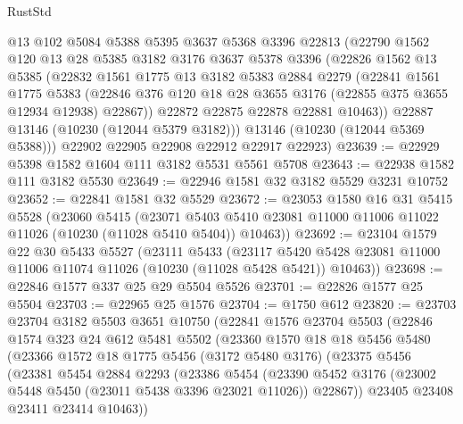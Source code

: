 \begin{lexlean}{RustStd}
\begin{coremodule}
        @13
        @102
        @5084
        @5388
        @5395
        @3637
        @5368
        @3396
        @22813
        (@22790
          @1562
          @120
          @13
          @28
          @5385
          @3182
          @3176
          @3637
          @5378
          @3396
          (@22826
            @1562
            @13
            @5385
            (@22832
              @1561
              @1775
              @13
              @3182
              @5383
              @2884
              @2279
              (@22841
                @1561
                @1775
                @5383
                (@22846 @376 @120 @18 @28 @3655 @3176 (@22855 @375 @3655 @12934 @12938) @22867))
              @22872
              @22875
              @22878
              @22881
              @10463))
          @22887
          @13146
          (@10230 (@12044 @5379 @3182)))
        @13146
        (@10230 (@12044 @5369 @5388)))
      @22902
      @22905
      @22908
      @22912
      @22917
      @22923)
@23639 := @22929 @5398 @1582 @1604 @111 @3182 @5531 @5561 @5708
@23643 := @22938 @1582 @111 @3182 @5530
@23649 := @22946 @1581 @32 @3182 @5529 @3231 @10752
@23652 := @22841 @1581 @32 @5529
@23672 := @23053
    @1580
    @16
    @31
    @5415
    @5528
    (@23060
      @5415
      (@23071 @5403 @5410 @23081 @11000 @11006 @11022 @11026 (@10230 (@11028 @5410 @5404)) @10463))
@23692 := @23104
    @1579
    @22
    @30
    @5433
    @5527
    (@23111
      @5433
      (@23117 @5420 @5428 @23081 @11000 @11006 @11074 @11026 (@10230 (@11028 @5428 @5421)) @10463))
@23698 := @22846 @1577 @337 @25 @29 @5504 @5526
@23701 := @22826 @1577 @25 @5504
@23703 := @22965 @25 @1576
@23704 := @1750 @612
@23820 := @23703
    @23704
    @3182
    @5503
    @3651
    @10750
    (@22841
      @1576
      @23704
      @5503
      (@22846
        @1574
        @323
        @24
        @612
        @5481
        @5502
        (@23360
          @1570
          @18
          @18
          @5456
          @5480
          (@23366
            @1572
            @18
            @1775
            @5456
            (@3172 @5480 @3176)
            (@23375
              @5456
              (@23381
                @5454
                @2884
                @2293
                (@23386
                  @5454
                  (@23390
                    @5452
                    @3176
                    (@23002 @5448 @5450 (@23011 @5438 @3396 @23021 @11026))
                    @22867))
                @23405
                @23408
                @23411
                @23414
                @10463))

\end{coremodule}
\end{lexlean}
